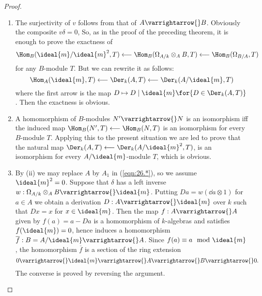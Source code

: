 \documentclass[../main]{subfiles}
\begin{document}
\begin{proof}
\begin{enumerate}
    \item The surjectivity of $v$ follows from that of $A \varrightarrow{} B$. Obviously the composite $v \delta=0$, So, as in the proof of the preceding theorem, it is enough to prove the exactness of \[\Hom_B(\ideal{m}/\ideal{m}^2, T)\longleftarrow\Hom_B(\Omega_{A / k} \otimes_A B, T)\longleftarrow\Hom_B(\Omega_{B / A}, T)\] for any $B$-module $T$. But we can rewrite it as follows: \[\Hom_A(\ideal{m}, T)\longleftarrow\Der_k(A, T)\longleftarrow\Der_k(A / \ideal{m}, T)\] where the first arrow is the map $D \mapsto D \mid \ideal{m} \for{D\in \Der_k(A, T)}$. Then the exactness is obvious.

    \item A homomorphism of $B$-modules $N' \varrightarrow{} N$ is an isomorphism iff the induced map $\Hom_B(N', T) \longleftarrow \Hom_B(N, T)$ is an isomorphism for every $B$-module $T$. Applying this to the present situation we are led to prove that the natural map $\Der_k(A, T)\longleftarrow \Der_k(A / \ideal{m}^2,T)$, is an isomorphism for every $A/\ideal{m}$-module $T$, which is obvious.

    \item By (ii) we may replace $A$ by $A_1$ in (\ref{eqn:26.*}), so we assume $\ideal{m}^2=0$. Suppose that $\delta$ has a left inverse $w: \Omega_{A / k} \otimes_A B \varrightarrow{} \ideal{m}$. Putting $Da =w(\dd a \otimes 1)$ for $a\in A$ we obtain a derivation $D: A\varrightarrow{} \ideal{m}$ over $k$ such that $D x=x$ for $x \in \ideal{m}$. Then the map $f: A \varrightarrow{} A$ given by $f(a)=a-Da$ is a homomorphism of $k$-algebras and satisfies $f(\ideal{m})=0$, hence induces a homomorphism $\overline{f}: B=A / \ideal{m}\varrightarrow{}A$. Since $f(a) \equiv a \mod \ideal{m}$, the homomorphism $\overline{f}$ is a section of the ring extension \[0 \varrightarrow{} \ideal{m} \varrightarrow{} A \varrightarrow{} B \varrightarrow{} 0.\] The converse is proved by reversing the argument.
\end{enumerate}
\end{proof}
\end{document}
